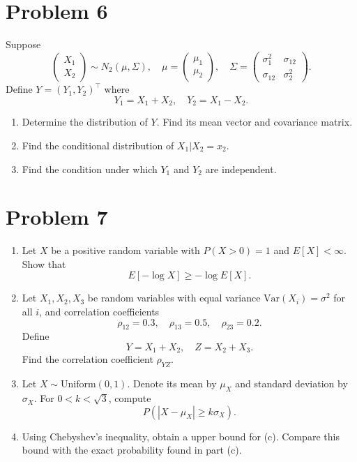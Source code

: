 \documentclass{article}
\begin{document}
\section*{Problem 6}
Suppose
\[
\begin{pmatrix} X_1 \\ X_2 \end{pmatrix} \sim N_2(\mu, \Sigma), \quad \mu = \begin{pmatrix} \mu_1 \\ \mu_2 \end{pmatrix}, \quad \Sigma = \begin{pmatrix} \sigma_1^2 & \sigma_{12} \\ \sigma_{12} & \sigma_2^2 \end{pmatrix}.
\]
Define $Y = (Y_1, Y_2)^\top$ where
\[
Y_1 = X_1 + X_2, \quad Y_2 = X_1 - X_2.
\]

\begin{enumerate}
    \item Determine the distribution of $Y$. Find its mean vector and covariance matrix.
    \item Find the conditional distribution of $X_1 | X_2 = x_2$.
    \item Find the condition under which $Y_1$ and $Y_2$ are independent.
\end{enumerate}

\section*{Problem 7}
\begin{enumerate}
    \item Let $X$ be a positive random variable with $P(X>0)=1$ and $E[X] < \infty$. Show that
    \[
    E[-\log X] \ge -\log E[X].
    \]
    \item Let $X_1, X_2, X_3$ be random variables with equal variance $\text{Var}(X_i) = \sigma^2$ for all $i$, and correlation coefficients
    \[
    \rho_{12} = 0.3, \quad \rho_{13} = 0.5, \quad \rho_{23} = 0.2.
    \]
    Define
    \[
    Y = X_1 + X_2, \quad Z = X_2 + X_3.
    \]
    Find the correlation coefficient $\rho_{YZ}$.

    \item Let $X \sim \text{Uniform}(0,1)$. Denote its mean by $\mu_X$ and standard deviation by $\sigma_X$. For $0 < k < \sqrt{3}$, compute
    \[
    P(|X - \mu_X| \ge k\sigma_X).
    \]

    \item Using Chebyshev's inequality, obtain a upper bound for (c). Compare this bound with the exact probability found in part (c).
\end{enumerate}
\end{document}
